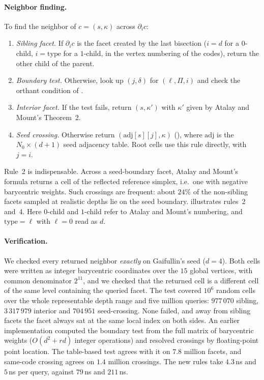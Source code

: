 \documentclass[11pt]{article}
\theoremstyle{plain}
\theoremstyle{definition}
\theoremstyle{remark}
\newcommand{\type}{\mathrm{type}}
\newcommand{\adj}{\mathrm{adj}}
\begin{document}
\paragraph{Neighbor finding.}
To find the neighbor of $c=(s,\kappa)$ across $\partial_ic$:
\begin{enumerate}[itemsep=2pt]
\item \emph{Sibling facet.} If $\partial_ic$ is the facet created by the
  last bisection ($i=d$ for a $0$-child, $i=\type$ for a $1$-child, in
  the vertex numbering of the codes), return the other child of the
  parent.
\item \emph{Boundary test.} Otherwise, look up $(j,\delta)$ for
  $(\ell,\Pi,i)$ and check the orthant condition of
  .
\item \emph{Interior facet.} If the test fails, return $(s,\kappa')$ with
  $\kappa'$ given by Atalay and Mount's Theorem~2.
\item \emph{Seed crossing.} Otherwise return $(\adj[s][j],\kappa)$
  (), where $\adj$ is the $N_0\times(d{+}1)$ seed
  adjacency table. Root cells use this rule directly, with $j=i$.
\end{enumerate}
Rule~2 is indispensable. Across a seed-boundary facet, Atalay and Mount's
formula returns a cell of the reflected reference simplex, i.e.\ one with
negative barycentric weights. Such crossings are frequent: about $24\%$
of the non-sibling facets sampled at realistic depths lie on the seed
boundary.  illustrates rules~2 and~4.
Here $0$-child and $1$-child refer to Atalay and Mount's numbering, and
$\type=\ell$ with $\ell=0$ read as $d$.

\paragraph{Verification.}
We checked every returned neighbor \emph{exactly} on Gaifullin's seed
($d=4$). Both cells were written as integer barycentric coordinates over
the $15$ global vertices, with common denominator $2^{11}$, and we
checked that the returned cell is a different cell of the same level
containing the queried facet. The test covered $10^6$ random cells over
the whole representable depth range and five million queries: $977\,070$
sibling, $3\,317\,979$ interior and $704\,951$ seed-crossing. None failed,
and away from sibling facets the facet always sat at the same local index
on both sides. An earlier implementation computed the boundary test from
the full matrix of barycentric weights ($O(d^2+rd)$ integer operations)
and resolved crossings by floating-point point location. The table-based
test agrees with it on $7.8$ million facets, and same-code crossing agrees
on $1.4$ million crossings. The new rules take $4.3$\,ns and $5$\,ns per
query, against $79$\,ns and $211$\,ns.
\end{document}
